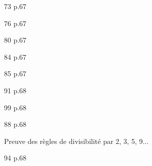 \documentclass[10pt,a4paper,openany,twoside,prof]{book}
\begin{document}
\begin{bookexo}{73  p.67}\end{bookexo}
\begin{bookexo}{76 p.67}\end{bookexo}
\begin{bookexo}{80 p.67}\end{bookexo}

\begin{bookexo}{84 p.67}\end{bookexo}
\begin{bookexo}{85 p.67}\end{bookexo}
\begin{bookexo}{91 p.68}\end{bookexo}
\begin{bookexo}{99 p.68}\end{bookexo}

\begin{bookexo}{88 p.68}\end{bookexo}


Preuve des règles de divisibilité par 2, 3, 5, 9...
\begin{bookexo}{94 p.68}\end{bookexo}
\end{document}
